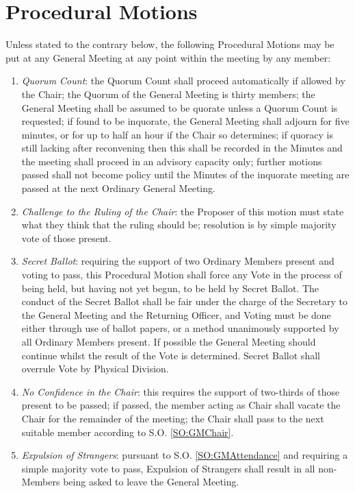 \section{Procedural Motions}
\npara \label{SO:ProceduralMotions} Unless stated to the contrary below, the following Procedural Motions may be put at any General Meeting at any point within the meeting by any member:
\begin{enumerate}
\item \label{SC:QuorumCount} \textit{Quorum Count}: the Quorum Count shall proceed automatically if allowed by the Chair; the Quorum of the General Meeting is thirty members; the General Meeting shall be assumed to be quorate unless a Quorum Count is requested; if found to be inquorate, the General Meeting shall adjourn for five minutes, or for up to half an hour if the Chair so determines; if quoracy is still lacking after reconvening then this shall be recorded in the Minutes and the meeting shall proceed in an advisory capacity only; further motions passed shall not become policy until the Minutes of the inquorate meeting are passed at the next Ordinary General Meeting.
\item \label{SC:ChallengeChairRuling} \textit{Challenge to the Ruling of the Chair}: the Proposer of this motion must state what they think that the ruling should be; resolution is by simple majority vote of those present.
\item \label{SC:SecretBallot} \textit{Secret Ballot}: requiring the support of two Ordinary Members present and voting to pass, this Procedural Motion shall force any Vote in the process of being held, but having not yet begun, to be held by Secret Ballot. The conduct of the Secret Ballot shall be fair under the charge of the Secretary to the General Meeting and the Returning Officer, and Voting must be done either through use of ballot papers, or a method unanimously supported by all Ordinary Members present. If possible the General Meeting should continue whilst the result of the Vote is determined. Secret Ballot shall overrule Vote by Physical Division.
\item \label{SC:NoChairConfidence} \textit{No Confidence in the Chair}: this requires the support of two-thirds of those present to be passed; if passed, the member acting as Chair shall vacate the Chair for the remainder of the meeting; the Chair shall pass to the next suitable member according to S.O. \ref{SO:GMChair}.
\item \label{SC:ExpelStrangers} \textit{Expulsion of Strangers}: pursuant to S.O. \ref{SO:GMAttendance} and requiring a simple majority vote to pass, Expulsion of Strangers shall result in all non-Members being asked to leave the General Meeting.

\end{enumerate}
